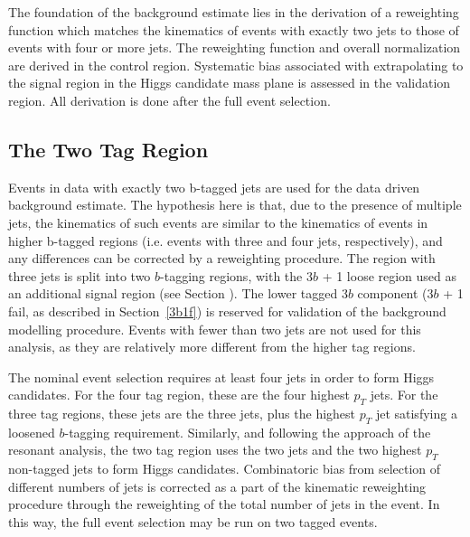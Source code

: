 The foundation of the background estimate lies in the derivation of a
reweighting function which matches the kinematics of events with exactly two
\btagged jets to those of events with four or more \btagged jets. The
reweighting function and overall normalization are derived in the control
region. Systematic bias associated with extrapolating to the signal region in
the Higgs candidate mass plane is assessed in the validation region. All
derivation is done after the full event selection.

\subsection{The Two Tag Region}

Events in data with exactly two b-tagged jets are used for the data driven 
background estimate. The hypothesis here is that, due to the presence of 
multiple \btagged jets, the kinematics of such events are similar to the 
kinematics of events in higher b-tagged regions (i.e. events with three and 
four \btagged jets, respectively), and any differences can be corrected by a 
reweighting procedure. The region with three \btagged jets is split into 
two $b$-tagging regions, with the 3$b$ + 1 loose region used as an additional signal 
region (see Section ). The lower tagged 3$b$ component 
(3$b$ + 1 fail, as described in Section~\ref{3b1f}) is reserved for validation
of the background modelling procedure. Events with fewer than two \btagged jets are not 
used for this analysis, as they are relatively more different from the higher tag regions.

The nominal event selection requires at least four jets in order to form Higgs
candidates. For the four tag region, these are the four highest $p_{T}$ \btagged 
jets. For the three tag regions, these jets are the three \btagged jets, plus the 
highest $p_{T}$ jet satisfying a loosened $b$-tagging requirement. Similarly, and following 
the approach of the resonant analysis, the two tag region uses the two \btagged jets 
and the two highest $p_{T}$ non-tagged jets to form Higgs candidates. Combinatoric bias 
from selection of different numbers of \btagged jets is corrected as a part of the kinematic 
reweighting procedure through the reweighting of the total number of jets in the event. In this way, 
the full event selection may be run on two tagged events. 

